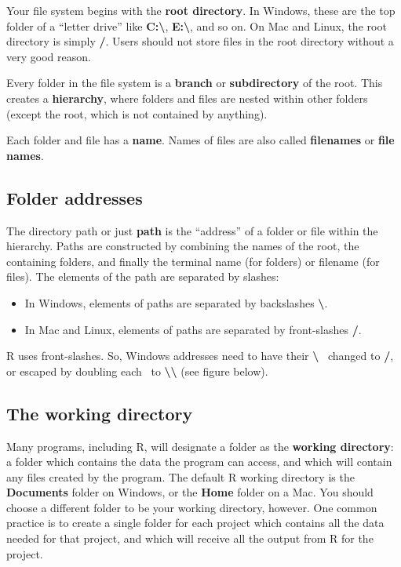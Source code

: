 \documentclass[
  13,
  letterpaper,
]{report}
\begin{document}
Your file system begins with the \textbf{root directory}. In Windows,
these are the top folder of a ``letter drive'' like
\textbf{C:\textbackslash{}}, \textbf{E:\textbackslash{}}, and so on. On
Mac and Linux, the root directory is simply \textbf{/}. Users should not
store files in the root directory without a very good reason.

Every folder in the file system is a \textbf{branch} or
\textbf{subdirectory} of the root. This creates a \textbf{hierarchy},
where folders and files are nested within other folders (except the
root, which is not contained by anything).

Each folder and file has a \textbf{name}. Names of files are also called
\textbf{filenames} or \textbf{file names}.

\subsection{Folder addresses}\label{sec-ie-files-address}

The directory path or just \textbf{path} is the ``address'' of a folder
or file within the hierarchy. Paths are constructed by combining the
names of the root, the containing folders, and finally the terminal name
(for folders) or filename (for files). The elements of the path are
separated by slashes:

\begin{itemize}
\item
  In Windows, elements of paths are separated by backslashes
  \textbf{\textbackslash{}}.
\item
  In Mac and Linux, elements of paths are separated by front-slashes
  \textbf{/}.
\end{itemize}

R uses front-slashes. So, Windows addresses need to have their
\textbf{\textbackslash{}} ~changed to \textbf{/}, or escaped by doubling
each ~to \textbf{\textbackslash\textbackslash{}} (see figure below).

\subsection{The working directory}\label{sec-ie-files-wd}

Many programs, including R, will designate a folder as the
\textbf{working directory}: a folder which contains the data the program
can access, and which will contain any files created by the program. The
default R working directory is the \textbf{Documents} folder on Windows,
or the \textbf{Home} folder on a Mac. You should choose a different
folder to be your working directory, however. One common practice is to
create a single folder for each project which contains all the data
needed for that project, and which will receive all the output from R
for the project.
\end{document}
